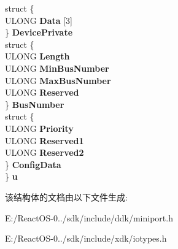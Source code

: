 \begin{DoxyCompactItemize}
\begin{tabbing}
\>struct \{\\
\>\>ULONG {\bfseries Data} \mbox{[}3\mbox{]}\\
\>\} {\bfseries DevicePrivate}\\
\>struct \{\\
\>\>ULONG {\bfseries Length}\\
\>\>ULONG {\bfseries MinBusNumber}\\
\>\>ULONG {\bfseries MaxBusNumber}\\
\>\>ULONG {\bfseries Reserved}\\
\>\} {\bfseries BusNumber}\\
\>struct \{\\
\>\>ULONG {\bfseries Priority}\\
\>\>ULONG {\bfseries Reserved1}\\
\>\>ULONG {\bfseries Reserved2}\\
\>\} {\bfseries ConfigData}\\
\} {\bfseries u}\\

\end{tabbing}\end{DoxyCompactItemize}


该结构体的文档由以下文件生成\+:\begin{DoxyCompactItemize}
\item 
E\+:/\+React\+O\+S-\/0../sdk/include/ddk/miniport.\+h\item 
E\+:/\+React\+O\+S-\/0../sdk/include/xdk/iotypes.\+h\end{DoxyCompactItemize}
